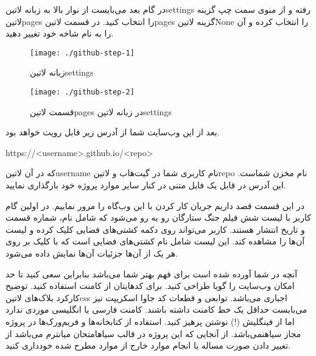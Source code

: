 \documentclass[../main.tex]{subfiles}
\begin{document}
در گام بعد می‌بایست از نوار بالا به زبانه ‌لاتین{settings} رفته و از منوی سمت چپ گزینه ‌لاتین{pages} را انتخاب کنید.
در قسمت ‌لاتین{pages} گزینه ‌لاتین{None} را انتخاب کرده و آن را به نام شاخه خود تغییر دهید.

\begin{figure}[h]
  \centering
  \texttt{[image: ./github-step-1]}
  \caption{زبانه ‌لاتین{settings}}
\end{figure}

\begin{figure}[h]
  \centering
  \texttt{[image: ./github-step-2]}
  \caption{قسمت ‌لاتین{pages} در زبانه ‌لاتین{settings}}
\end{figure}

بعد از این وب‌سایت شما از آدرس زیر قابل رویت خواهد بود.

\begin{latin}\begin{center}
https://<username>.github.io/<repo>
\end{center}\end{latin}

که در آن ‌لاتین{username} نام کاربری شما در گیت‌هاب و ‌لاتین{repo} نام مخزن شماست. این آدرس در قابل یک فایل متنی در کنار سایر موارد پروژه خود بارگذاری نمایید.


در این قسمت قصد داریم جریان کار کردن با این وب‌گاه را مرور نماییم.
در اولین گام کاربر با لیست شش فیلم جنگ ستارگان رو به رو می‌شود که شامل
نام، شماره قسمت و تاریخ انتشار هستند.
کاربر می‌تواند روی دکمه کشتی‌های فضایی کلیک کرده و لیست آن‌ها را مشاهده کند.
این لیست شامل نام کشتی‌های فضایی است که با کلیک بر روی هر یک از آن‌ها
جزئیات آن‌ها نمایش داده می‌شود.


 آنچه در شما آورده شده است برای فهم بهتر شما می‌باشد بنابراین سعی کنید تا حد امکان وب‌سایت را گویا طراحی کنید.
 برای کدهایتان از کامنت استفاده کنید. توضیح کارکرد بلاک‌های ‌لاتین{css} اجباری می‌باشد. توابعی و قطعات کد جاوا اسکریپت نیز می‌بایست حداقل یک خط کامنت داشته باشند.
 کامنت فارسی یا انگلیسی موردی ندارد اما از فینگلیش (!) نوشتن پرهیز کنید.
 استفاده از کتابخانه‌ها و فریم‌ورک‌ها در پروژه مجاز ‌سیاه{نمی‌باشد}.
 از آنجایی که این پروژه در قالب ‌سیاه{امتحان میانترم} می‌باشد از تغییر دادن صورت مساله یا انجام موارد خارج از موارد مطرح شده خودداری کنید.

\end{document}
